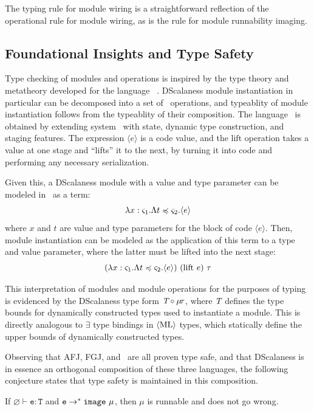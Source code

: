 The  typing rule for module wiring is a straightforward reflection of the
operational rule for module wiring, as is the  rule for module runnability
imaging.

\subsection{Foundational Insights and Type Safety} 
\label{section-framedml}


Type checking of modules and operations is inspired by the type theory and metatheory developed
for the language \fml\ \cite{FramedML}. DScalaness module instantiation in particular can be
decomposed into a set of \fml\ operations, and typeablity of module instantiation follows from
the typeablity of their composition. The language \fml\ is obtained by extending system \fsub\
with state, dynamic type construction, and staging features. The expression $\langle e \rangle$
is a code value, and the $\mathrm{lift}$ operation takes a value at one stage and ``lifts'' it
to the next, by turning it into code and performing any necessary serialization.

Given this, a DScalaness module with a value and type parameter can be
modeled in \fml\ as a term: 
$$\lambda x : \varsigma_1 . \Lambda t \preccurlyeq \varsigma_2 . \langle e \rangle$$
where $x$ and $t$ are value and type parameters for the block of code $\langle e \rangle$. Then,
module instantiation can be modeled as the application of this term to a type and value
parameter, where the latter must be lifted into the next stage:
$$
(\lambda x : \s_1 . \Lambda t \subtype \s_2 . \langle e \rangle)\ (\mathrm{lift}\ e)\ \t
$$ 

This interpretation of modules and module operations for the purposes of typing is evidenced by
the DScalaness type form $\textit{T} \circ \mu\!\tau$, where $\textit{T}$ defines the type bounds
for dynamically constructed types used to instantiate a module. This is directly analogous to
$\exists$ type bindings in $\langle \text{ML} \rangle$ types, which statically define the upper bounds of dynamically
constructed types.

Observing that AFJ, FGJ, and \fml\ are all proven type safe, and that DScalaness is in essence
an orthogonal composition of these three languages, the following conjecture states that type
safety is maintained in this composition.
\pagebreak
\begin{conject}
  If $\varnothing \vdash \texttt{e} : \texttt{T}$ and $\texttt{e} \rightarrow^* \mathtt{image}\ \mu$,
  then $\mu$ is runnable and does not go wrong.
\end{conject}

